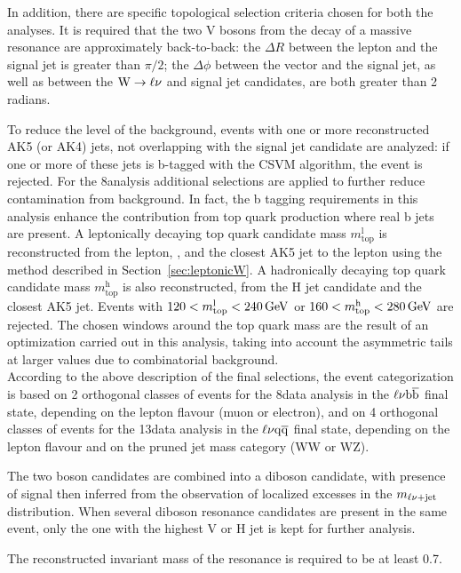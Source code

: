 In addition, there are specific topological selection criteria chosen for both the analyses. 
It is required that the two V bosons from the decay of a massive resonance are approximately back-to-back:
the $\Delta R$ between the lepton and the signal jet is greater than $\pi/2$; the $\Delta\phi$ between the vector \ptvecmiss and the signal jet,
as well as between the $\mathrm{W}\to\ell\nu$ and signal jet candidates, are both greater than 2 radians.

To reduce the level of the \ttbar background, events with one or more reconstructed AK5 (or AK4) jets, not overlapping with the signal jet candidate are analyzed:
if one or more of these jets is b-tagged with the CSVM algorithm, the event is rejected.
For the 8\TeV analysis additional selections are applied to further reduce contamination from \ttbar background.
In fact, the b tagging requirements in this analysis enhance the contribution from top quark production where real b jets are present.
A leptonically decaying top quark candidate mass $m_\mathrm{top}^\mathrm{l}$ is reconstructed from the lepton, \ETmiss, and the closest AK5 jet to the lepton using the method described in Section~\ref{sec:leptonicW}.
A hadronically decaying top quark candidate mass $m_\mathrm{top}^\mathrm{h}$ is also reconstructed, from the H jet candidate and the closest AK5 jet.
Events with $120 < m_\mathrm{top}^\mathrm{l} < 240\,\text{Ge\hspace{-.08em}V}$ or $160 < m_\mathrm{top}^\mathrm{h} < 280\,\text{Ge\hspace{-.08em}V}$ are rejected.
The chosen windows around the top quark mass are the result of an optimization carried out in this analysis, taking into account
the asymmetric tails at larger values due to combinatorial background.\\

According to the above description of the final selections, the event categorization is based on 2 orthogonal classes of events for the 8\TeV data analysis in the $\ell\nu{\mathrm{b}\overline{\mathrm{b}}}$ final state,
depending on the lepton flavour (muon or electron),
and on 4 orthogonal classes of events for the 13\TeV data analysis in the $\ell\nu\mathrm{q}\overline{\mathrm{q}}$ final state, depending on the lepton flavour and on the pruned jet mass category (WW or WZ).

The two boson candidates are combined into a diboson candidate, with presence of signal then inferred from the observation of localized excesses in the $m_{\ell\nu+{\rm jet}}$ distribution.
When several diboson resonance candidates are present in the same event, only the one with the highest \pt
V or H jet is kept for further analysis.

The reconstructed invariant mass of the resonance is required to be at least 0.7\TeV.\\ 

